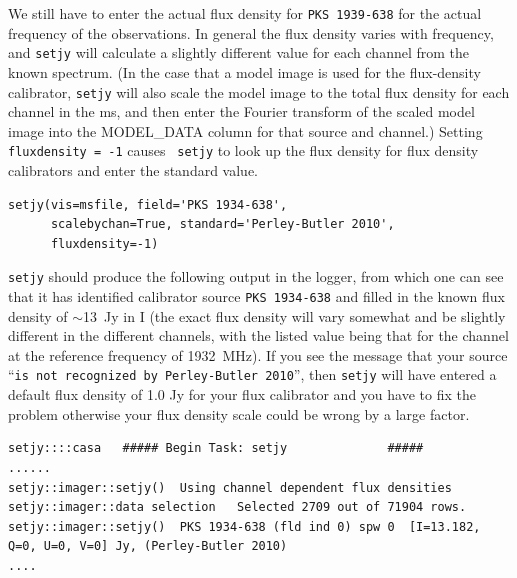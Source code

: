 \documentclass[force,almostfull,justified]{tufte-book}
\begin{document}

We still have to enter the actual flux density for {\tt PKS~1939-638} for the actual frequency of the
observations.  In general the flux density varies with frequency, and {\tt setjy} will calculate a
slightly different value for each channel from the known spectrum.  (In the case that a model image is
used for the flux-density calibrator, {\tt setjy} will also scale the model image to the total flux
density for each channel in the ms, and then enter the Fourier transform of the scaled model image
into the MODEL\_DATA column for that source and channel.) Setting {\tt fluxdensity = -1} causes {\tt
setjy} to look up the flux density for flux density calibrators and enter the standard value.


\begin{casacmd}
\begin{verbatim}
setjy(vis=msfile, field='PKS 1934-638',
      scalebychan=True, standard='Perley-Butler 2010',
      fluxdensity=-1)
\end{verbatim}
\end{casacmd}

\medskip
{\tt setjy} should produce the following output in the logger, from which one can see that it has
identified calibrator source {\tt PKS~1934-638} and filled in the known flux density of $\sim$13~Jy in
I (the exact flux density will vary somewhat and be slightly different in the different channels, with
the listed value being that for the channel at the reference frequency of 1932~MHz).  If you see the
message that your source ``{\tt is not recognized by Perley-Butler 2010}'', then {\tt setjy} will have
entered a default flux density of 1.0 Jy for your flux calibrator and you have to fix the problem
otherwise your flux density scale could be wrong by a large factor.

\begin{casaoutput}
\begin{verbatim}
setjy::::casa	##### Begin Task: setjy              #####
......
setjy::imager::setjy()	Using channel dependent flux densities
setjy::imager::data selection	Selected 2709 out of 71904 rows.
setjy::imager::setjy()	PKS 1934-638 (fld ind 0) spw 0  [I=13.182, Q=0, U=0, V=0] Jy, (Perley-Butler 2010)
....
\end{verbatim}
\end{casaoutput}
\end{document}
